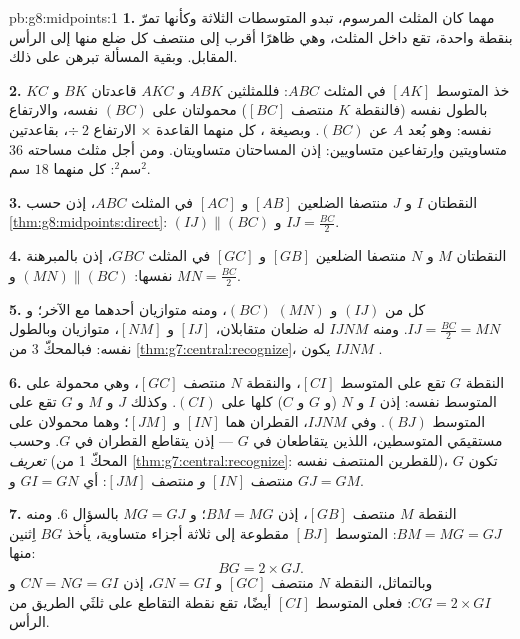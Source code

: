 \begin{solution}{pb:g8:midpoints:1}
\textbf{1.} مهما كان المثلث المرسوم، تبدو المتوسطات الثلاثة
وكأنها تمرّ بنقطة واحدة، تقع داخل المثلث،
وهي ظاهرًا أقرب إلى منتصف كل ضلع منها إلى الرأس
المقابل. وبقية المسألة تبرهن على ذلك.

\textbf{2.} خذ المتوسط $[AK]$ في المثلث $ABC$: فللمثلثين
$ABK$ و $AKC$ قاعدتان $BK$ و $KC$ بالطول
نفسه (فالنقطة $K$ منتصف $[BC]$) محمولتان على 
$(BC)$ نفسه، والارتفاع نفسه: وهو بُعد $A$ عن $(BC)$.
وبصيغة ،  كل منهما
القاعدة $\times$ الارتفاع $\div\ 2$، بقاعدتين متساويتين واِرتفاعين
متساويين: إذن المساحتان متساويتان. ومن أجل مثلث مساحته
$36$ سم$^2$:   كل منهما $18$ سم$^2$.

\textbf{3.} النقطتان $I$ و $J$ منتصفا الضلعين $[AB]$ و
$[AC]$ في المثلث $ABC$، إذن حسب
\cref{thm:g8:midpoints:direct}: $(IJ) \parallel (BC)$ و
$IJ = \frac{BC}{2}$.

\textbf{4.} النقطتان $M$ و $N$ منتصفا الضلعين $[GB]$ و
$[GC]$ في المثلث $GBC$، إذن بالمبرهنة نفسها:
$(MN) \parallel (BC)$ و $MN = \frac{BC}{2}$.

\textbf{5.} كل من $(IJ)$ و $(MN)$   $(BC)$، ومنه
متوازيان أحدهما مع الآخر؛ و $IJ = \frac{BC}{2} = MN$. ومنه 
$IJNM$ له ضلعان متقابلان، $[IJ]$ و
$[NM]$، متوازيان وبالطول نفسه: فبالمحكّ 3 من
\cref{thm:g7:central:recognize}، يكون $IJNM$ .

\textbf{6.} النقطة $G$ تقع على المتوسط $[CI]$، والنقطة $N$
منتصف $[GC]$، وهي  محمولة على  المتوسط نفسه:
إذن $I$ و $N$ (و $G$ و $C$) كلها على $(CI)$. وكذلك $J$ و $M$
و $G$ تقع على  المتوسط $(BJ)$. وفي 
$IJNM$، القطران هما $[IN]$ و $[JM]$؛ وهما محمولان على
مستقيمَي المتوسطين، اللذين يتقاطعان في $G$ --- إذن يتقاطع القطران
في $G$. وحسب \emph{تعريف} 
(المحكّ 1 من \cref{thm:g7:central:recognize}: للقطرين
المنتصف نفسه)، تكون $G$ منتصف $[IN]$ \emph{و}
منتصف $[JM]$: أي $GI = GN$ و $GJ = GM$.

\textbf{7.} النقطة $M$ منتصف $[GB]$، إذن $BM = MG$؛ و
$MG = GJ$ بالسؤال 6. ومنه $BM = MG = GJ$:  المتوسط
$[BJ]$ مقطوعة إلى ثلاثة أجزاء متساوية، يأخذ $BG$ اِثنين منها:
\[
BG = 2 \times GJ .
\]
وبالتماثل، النقطة $N$ منتصف $[GC]$ و $GN = GI$، إذن
$CN = NG = GI$ و $CG = 2 \times GI$: فعلى المتوسط $[CI]$ أيضًا،
تقع نقطة التقاطع على ثلثَي الطريق من الرأس.


\end{solution}
